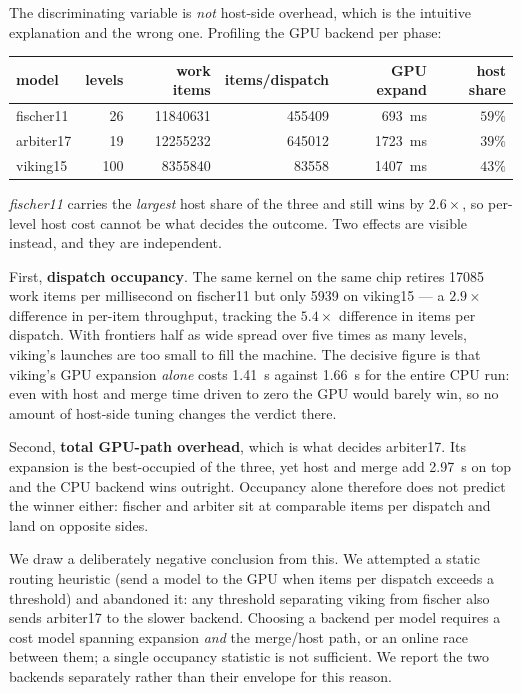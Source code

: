 The discriminating variable is \emph{not} host-side overhead, which is the
intuitive explanation and the wrong one.  Profiling the GPU backend per phase:

\begin{center}
\begin{tabular}{lrrrrr}
\toprule
model & levels & work items & items/dispatch & GPU expand & host share \\
\midrule
fischer11 & 26  & \num{11840631} & \num{455409} & \SI{693}{\milli\second}  & $59\%$ \\
arbiter17 & 19  & \num{12255232} & \num{645012} & \SI{1723}{\milli\second} & $39\%$ \\
viking15  & 100 & \num{8355840}  & \num{83558}  & \SI{1407}{\milli\second} & $43\%$ \\
\bottomrule
\end{tabular}
\end{center}

\emph{fischer11} carries the \emph{largest} host share of the three and still wins
by $2.6\times$, so per-level host cost cannot be what decides the outcome.  Two
effects are visible instead, and they are independent.

First, \textbf{dispatch occupancy}.  The same kernel on the same chip retires
\num{17085} work items per millisecond on fischer11 but only \num{5939} on
viking15 --- a $2.9\times$ difference in per-item throughput, tracking the $5.4\times$
difference in items per dispatch.  With frontiers half as wide spread over five
times as many levels, viking's launches are too small to fill the machine.  The
decisive figure is that viking's GPU expansion \emph{alone} costs
\SI{1.41}{\second} against \SI{1.66}{\second} for the entire CPU run: even with
host and merge time driven to zero the GPU would barely win, so no amount of
host-side tuning changes the verdict there.

Second, \textbf{total GPU-path overhead}, which is what decides arbiter17.  Its
expansion is the best-occupied of the three, yet host and merge add
\SI{2.97}{\second} on top and the CPU backend wins outright.  Occupancy alone
therefore does not predict the winner either: fischer and arbiter sit at
comparable items per dispatch and land on opposite sides.

We draw a deliberately negative conclusion from this.  We attempted a static
routing heuristic (send a model to the GPU when items per dispatch exceeds a
threshold) and abandoned it: any threshold separating viking from fischer also
sends arbiter17 to the slower backend.  Choosing a backend per model requires a
cost model spanning expansion \emph{and} the merge/host path, or an online race
between them; a single occupancy statistic is not sufficient.  We report the two
backends separately rather than their envelope for this reason.

